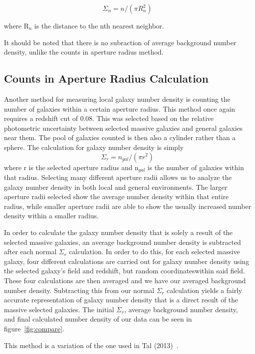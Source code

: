 \documentclass[apj]{emulateapj}
\begin{document}
 $$\Sigma_{n} = n / (\pi  R_{n}^{2})$$

 where R$_{n}$ is the distance to the nth nearest neighbor. 

It should be noted that there is no subraction of average background number density, unlike the counts in aperture radius method.



\subsection{Counts in Aperture Radius Calculation}

Another method for measuring local galaxy number density is counting the number of galaxies within a certain aperture radius. This method once again requires a redshift cut of 0.08. This was selected based on the relative photometric uncertainty between selected massive galaxies and general galaxies near them. The pool of galaxies counted is then also a cylinder rather than a sphere. The calculation for galaxy number density is simply
 $$\Sigma_{r} = n_{gal} / (\pi r^{2})$$
 where r is the selected aperture radius and n$_{gal}$ is the number of galaxies within that radius. Selecting many different aperture radii allows us to analyze the galaxy number density in both local and general environments. The larger aperture radii selected show the average number density within that entire radius, while smaller aperture radii are able to show the usually increased number density within a smaller radius.

In order to calculate the galaxy number density that is solely a result of the selected massive galaxies, an average background number density is subtracted after each normal $\Sigma_{r}$ calculation. In order to do this, for each selected massive galaxy, four different calculations are carried out for galaxy number density using the selected galaxy's field and redshift, but random coordinateswithin said field. These four calculations are then averaged and we have our averaged background number density. Subtracting this from our normal $\Sigma_{r}$ calculation yields a fairly accurate representation of galaxy number density that is a direct result of the massive selected galaxies. The initial $\Sigma_{r}$, average background number density, and final calculated number density of our data can be seen in figure~\ref{fig:compare}.

This method is a variation of the one used in Tal (2013)~\cite{2013ApJ...769...31T}.
\end{document}
